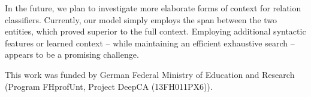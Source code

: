 \documentclass{ecai}
\begin{document}
In the future, we plan to investigate more elaborate forms of context for relation classifiers. Currently, our model simply employs the span between the two entities, which proved superior to the full context. Employing additional syntactic features or learned context -- while maintaining an efficient exhaustive search -- appears to be a promising challenge.

\ack This work was funded by German Federal Ministry of Education and Research (Program FHprofUnt, Project DeepCA (13FH011PX6)).


\end{document}
